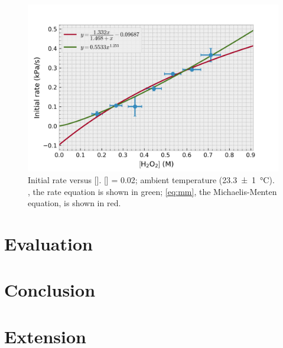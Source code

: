 \documentclass[a4paper, 12pt]{article}
\begin{document}
\begin{figure}[H]
    \centering
    \includegraphics[width=\textwidth]{data/processed_data}
    \caption{Initial rate versus []. [] = \SI{0.02}{\molar}; ambient temperature (\SI{23.3(10)}{\celsius}). , the rate equation is shown in green; \cref{eq:mm}, the Michaelis-Menten equation, is shown in red. }
    \label{fig:processed-data}
\end{figure}



\section*{Evaluation}

\section*{Conclusion}

\section*{Extension}

\printbibliography
\end{document}
